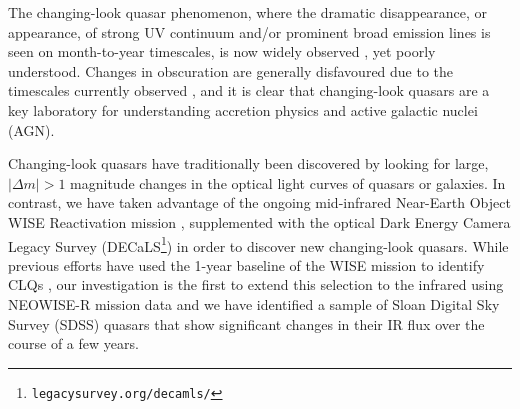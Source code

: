 \documentclass{nature}
\begin{document}

The changing-look quasar phenomenon, where the dramatic disappearance, or appearance, of strong UV continuum and/or prominent broad emission lines is seen on month-to-year timescales, is now widely observed \cite{LaMassa2015, MacLeod2016, Runnoe2016, Ruan2016, Gezari2017, Rumbaugh2017, Yang2017}, yet poorly understood. Changes in obscuration are generally disfavoured due to the timescales currently observed \cite{Hutsemekers2017, Sheng2017}, and it is clear that changing-look quasars are a key laboratory for understanding accretion physics and active galactic nuclei (AGN).

Changing-look quasars have traditionally been discovered by looking for large, $| \Delta m | >1$ magnitude changes in the optical light curves of quasars or galaxies. In contrast, we have taken advantage of the ongoing mid-infrared Near-Earth Object WISE Reactivation mission \cite[NEOWISE-R; ][]{Mainzer2014, Meisner2017a, Meisner2017b}, supplemented with the optical Dark Energy Camera Legacy Survey (DECaLS\footnote{{\tt legacysurvey.org/decamls/}}) in order to discover new changing-look quasars. While previous efforts have used the 1-year baseline of the WISE mission to identify CLQs \cite[e.g.,][]{Assef2017}, our investigation is the first to extend this selection to the infrared using NEOWISE-R mission data and we have identified a sample of Sloan Digital Sky Survey (SDSS) quasars that show significant changes in their IR flux over the course of a few years.
\end{document}
